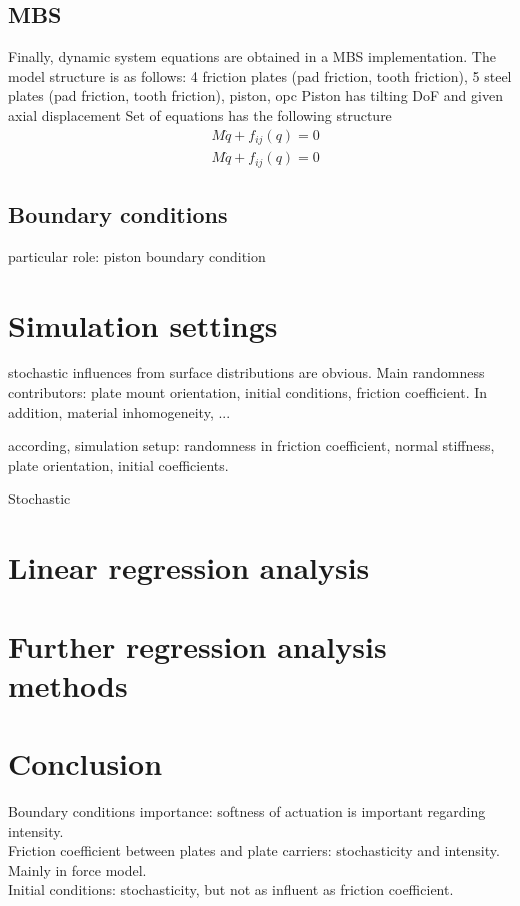 \documentclass[a4paper,fleqn]{cas-dc}
\begin{document}
\subsection{MBS}
Finally, dynamic system equations are obtained in a MBS implementation. The model structure is as follows: 
4 friction plates (pad friction, tooth friction),
5 steel plates (pad friction, tooth friction), 
piston, 
opc
Piston has tilting DoF and given axial displacement 
Set of equations has the following structure 
\begin{align}
	&{M}\ddot{{q}} + f_{ij}(q) = 0\\
	&{M}\ddot{{q}} + f_{ij}(q) = 0
\end{align}

\subsection{Boundary conditions}
particular role: piston boundary condition 
\section{Simulation settings}
stochastic influences from surface distributions are obvious. Main randomness contributors: plate mount orientation, initial conditions, friction coefficient. In addition, material inhomogeneity, ... 

according, simulation setup: 
randomness in friction coefficient, normal stiffness, plate orientation, initial coefficients.

Stochastic 

\section{Linear regression analysis}
\section{Further regression analysis methods}

\section{Conclusion}
Boundary conditions importance: softness of actuation is important regarding intensity. \\
Friction coefficient between plates and plate carriers: stochasticity and intensity. Mainly in force model.  \\
Initial conditions: stochasticity, but not as influent as friction coefficient. \\
\end{document}
